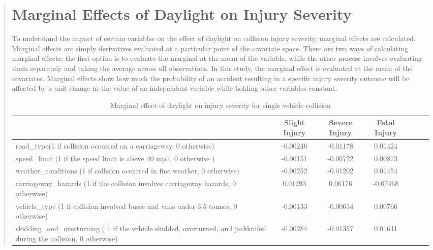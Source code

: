 \documentclass[12]{report}
\begin{document}
\begin{quote}
{\section{Marginal Effects of Daylight on Injury Severity}

To understand the impact of certain variables on the effect of daylight on collision injury severity, marginal effects are calculated. Marginal effects are simply derivatives evaluated at a particular point of the covariate space. There are two ways of calculating marginal effects; the first option is to evaluate the marginal at the mean of the variable,  while the other process involves evaluating them separately and taking the average across all observations. In this study, the marginal effect is evaluated at the mean of the covariates. Marginal effects show how much the probability of an accident resulting in a specific injury severity outcome will be affected by a unit change in the value of an independent variable while holding other variables constant.

\begin{table}[H]
\renewcommand{\arraystretch}{1.5}
\centering
\caption{Marginal effect of daylight on injury severity for single vehicle collision}
\begin{tabular}{p{11cm} ccc ccc}
\toprule
  & \textbf{Slight Injury} & \textbf{Severe Injury} & \textbf{Fatal Injury} \\
\midrule
road\_type(1 if collision occurred on a carriageway, 0 otherwise) & -0.00246 & -0.01178 & 0.01424 \\

speed\_limit (1 if the speed limit is above 40 mph, 0 otherwise )  & -0.00151 & -0.00722 & 0.00873 \\

weather\_conditions (1 if collision occurred in fine weather, 0 otherwise) & -0.00252 & -0.01202 & 0.01454 \\

carriageway\_hazards  (1 if the collision involves carriageway hazards, 0 otherwise) & 0.01293 & 0.06176 & -0.07468 \\

vehicle\_type (1 if collision involved buses and vans under 3.5 tonnes, 0 otherwise) & -0.00133 & -0.00634 & 0.00766 \\

skidding\_and\_overturning ( 1 if the vehicle skidded, overturned, and  jackknifed during the collision, 0 otherwise) & -0.00284 & -0.01357 & 0.01641 \\


\end{tabular}
\end{table}}
\end{quote}
\end{document}
